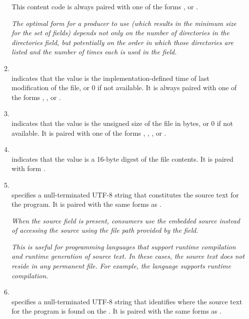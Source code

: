 \begin{enumerate}[1. ]
This content code is always paired with one of 
\bb
the forms
\eb
\DWFORMdataone, \DWFORMdatatwo{} or \DWFORMudata.

\textit{The optimal form for a producer to use (which results in the
minimum size for the set of  fields) depends not only
on the number of directories in the directories
field, but potentially on the order in which those directories are
listed and the number of times each is used in the  field.}

\item \DWLNCTtimestampTARG \\
\DWLNCTtimestampNAME{} indicates that the value is the implementation-defined 
time of last modification of the file, or 0 if not available. 
It is always paired with one of the forms
\DWFORMudata, \DWFORMdatafour, \DWFORMdataeight{} or \DWFORMblock.

\item  \DWLNCTsizeTARG \\
\DWLNCTsizeNAME{} indicates that the value is the unsigned size of the
file in bytes, or 0 if not available. It is paired with one of the
forms \DWFORMudata, \DWFORMdataone, \DWFORMdatatwo, \DWFORMdatafour{}
or \DWFORMdataeight.

\item \DWLNCTMDfiveTARG \\
\DWLNCTMDfiveNAME{} indicates that the value is a 16-byte \MDfive{} digest
of the file contents. It is paired with form \DWFORMdatasixteen.

\bb
\item \DWLNCTsourceTARG \\
\DWLNCTsourceNAME{} specifies a null-terminated UTF-8 string that
constitutes the source text for the program. It is paired with the same 
forms as \DWLNCTpath. 

\textit{When the source field is present, consumers use the embedded source
instead of accessing the source using the file path
provided by the \DWLNCTpath{} field.}

\textit{This is useful for programming languages that support runtime
compilation and runtime generation of source text. In these cases, the
source text does not reside in any permanent file. For example, the \OpenCLC{}
language supports runtime compilation.}
\eb

\bb
\item \DWLNCTURLTARG \\
\DWLNCTURLNAME{} specifies a null-terminated UTF-8 string that identifies
where the source text for the program is found on the .
It is paired with the same forms as \DWLNCTpath.
\eb

\end{enumerate}


